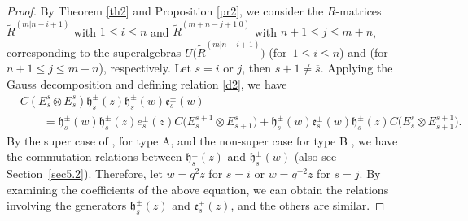 \documentclass[10pt,a4paper]{amsart}
\numberwithin{equation}{section}
\begin{document}
\begin{proof}
By Theorem \ref{th2} and Proposition \ref{pr2}, we consider the $R$-matrices $\widetilde{R}^{(m|n-i+1)}$ with $1\leq i\leq n$ and $\widetilde{R}^{(m+n-j+1|0)}$ with $n+1\leq j\leq m+n$, corresponding to the superalgebras $U\bigl(\widetilde{R}^{(m|n-i+1)}\bigr)$ (for~${1\leq i\leq n}$) and  (for $n+1\leq j\leq m+n$), respectively. Let $s=i$ or $j$, then $s+1\neq \overline{s}$. Applying the Gauss decomposition and defining relation \eqref{d2}, we have
\begin{align*}
 & C(E^s_s\otimes E^s_s) \mathfrak{h}_s^{\pm}(z)\mathfrak{h}_s^{\pm}(w)\mathfrak{e}_s^{\pm}(w)\\
 &\qquad =\mathfrak{h}_s^{\pm}(w)
 \mathfrak{h}_s^{\pm}(z)e_s^{\pm}(z)C\bigl(E^{s+1}_s\otimes E^s_{s+1}\bigr) + \mathfrak{h}_s^{\pm}(w)\mathfrak{e}_s^{\pm}(w)\mathfrak{h}_s^{\pm}(z)C\bigl(E^s_s\otimes E^{s+1}_{s+1}\bigr).
\end{align*}
By the super case of \cite[relations (33)--(34)]{JSKW}, \cite[Definition~2]{HBKD} for type A, and the non-super case for type B \cite[Theorem 4.29]{JMAB}, we have the commutation relations between $\mathfrak{h}_s^{\pm}(z)$ and $\mathfrak{h}_s^{\pm}(w)$ (also see Section~\ref{sec5.2}). Therefore, let $w=q^{2}z$ for $s=i$ or $w=q^{-2}z$ for $s=j$. By examining the coefficients of the above equation, we can obtain the relations involving the generators $\mathfrak{h}_s^{\pm}(z)$ and $\mathfrak{e}_s^{\pm}(z)$, and the others are similar.
\end{proof}
\end{document}
